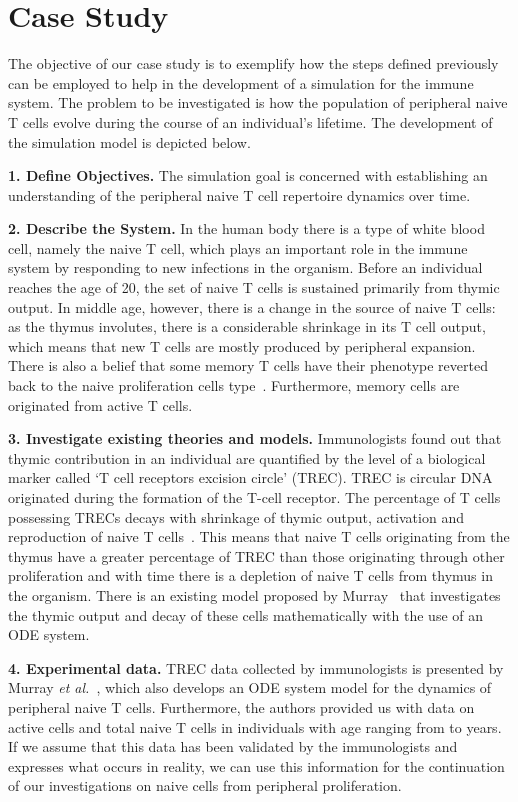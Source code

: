 \documentclass{llncs}
\begin{document}
\section{Case Study}
\label{CaseStudy}

The objective of our case study is to exemplify how the steps defined previously can be employed to help in the development of a simulation for the immune system. The problem to be investigated  is how the population of peripheral naive T cells evolve during the course of an individual's lifetime. The development of the simulation model is depicted below.

{\bf 1. Define Objectives.} The simulation goal is concerned with establishing an understanding of the peripheral naive T cell repertoire dynamics over time.

{\bf 2. Describe the System.} In the human body there is a type of white blood cell, namely the naive T cell, which plays an important role in the immune system by responding to new infections in the organism. Before an individual reaches the age of 20, the set of naive T cells is sustained primarily from thymic output. In middle age, however, there is a change in the source of naive T cells: as the thymus involutes, there is a considerable shrinkage in its T cell output, which means that new T cells are mostly produced by peripheral expansion. There is also a belief that some memory T cells have their phenotype reverted back to the naive proliferation cells type~\cite{Murray:2003}. Furthermore, memory cells are originated from active T cells.

{\bf 3. Investigate existing theories and models.} Immunologists found out that thymic contribution in an individual are quantified by the level of a biological marker called `T cell receptors excision circle' (TREC). TREC is circular DNA originated during the formation of the T-cell receptor. The percentage of T cells possessing TRECs decays with shrinkage of thymic output, activation and reproduction of naive T cells~\cite{Murray:2003}. This means that naive T cells originating from the thymus have a greater percentage of TREC than those originating through other proliferation and with time there is a depletion of naive T cells from thymus in the organism. There is an existing model proposed by Murray~\cite{Murray:2003} that investigates the thymic output and decay of these cells mathematically with the use of an ODE system.

{\bf 4. Experimental data.} TREC data collected by immunologists is presented by Murray {\it et al.}~\cite{Murray:2003}, which also develops an ODE system model for the dynamics of peripheral naive T cells. Furthermore, the authors provided us with data on active cells and total naive T cells in individuals with age ranging from  to  years. If we assume that this data has been validated by the immunologists and expresses what occurs in reality, we can use this information for the continuation of our investigations on naive cells from peripheral proliferation.
\end{document}

